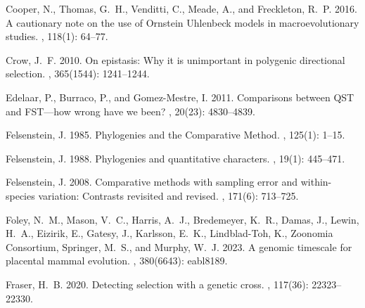 \documentclass{article}
\begin{document}
\begin{thebibliography}{}
    Cooper, N., Thomas, G.~H., Venditti, C., Meade, A., and Freckleton, R.~P. 2016.
    \newblock A cautionary note on the use of {{Ornstein Uhlenbeck}} models in
    macroevolutionary studies.
    , {118}(1): 64--77.

    Crow, J.~F. 2010.
    \newblock On epistasis: Why it is unimportant in polygenic directional
    selection.
    , {365}(1544): 1241--1244.

    Edelaar, P., Burraco, P., and {Gomez-Mestre}, I. 2011.
    \newblock Comparisons between {{QST}} and {{FST}}---how wrong have we been?
    , {20}(23): 4830--4839.

    Felsenstein, J. 1985.
    \newblock Phylogenies and the {{Comparative Method}}.
    , {125}(1): 1--15.

    Felsenstein, J. 1988.
    \newblock Phylogenies and quantitative characters.
    , {19}(1): 445--471.

    Felsenstein, J. 2008.
    \newblock Comparative methods with sampling error and within-species variation:
    Contrasts revisited and revised.
    , {171}(6): 713--725.

    Foley, N.~M., Mason, V.~C., Harris, A.~J., Bredemeyer, K.~R., Damas, J., Lewin,
    H.~A., Eizirik, E., Gatesy, J., Karlsson, E.~K., {Lindblad-Toh}, K.,
        {Zoonomia Consortium}, Springer, M.~S., and Murphy, W.~J. 2023.
    \newblock A genomic timescale for placental mammal evolution.
    , {380}(6643): eabl8189.

    Fraser, H.~B. 2020.
    \newblock Detecting selection with a genetic cross.
    , {117}(36):
    22323--22330.


\end{thebibliography}
\end{document}
